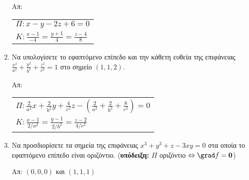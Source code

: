 \begin{enumerate}
    \hfill Απ: \begin{tabular}{l}
      $ \Pi : x-y-2z+6=0 $ \\
      $ K : \frac{x-1}{-4} = \frac{y+1}{4} = \frac{z-4}{8} $
    \end{tabular} 

  \item Να υπολογίσετε το εφαπτόμενο επίπεδο και την κάθετη ευθεία της επιφάνειας 
    $ \frac{x^{2}}{a^{2}} + \frac{y^{2}}{b^{2}} + \frac{z^{2}}{c^{2}} = 1  $ στο σημείο 
    $ (1,1,2) $.

    \hfill Απ: \begin{tabular}{l}
      $ \Pi : \frac{2}{a^{2}} x+ \frac{2}{b^{2}} y+ \frac{4}{c^{2}} z- 
      \left(\frac{2}{a^{2}}+ \frac{2}{b^{2}}+ \frac{8}{c^{2}}\right) = 0 $ \\
      $ K : \frac{x-1}{2/a^{2}} = \frac{y-1}{2/b^{2}} = \frac{z-2}{4/c^{2}} $
    \end{tabular} 

  \item Να προσδιορίσετε τα σημεία της επιφάνειας $ x^{3}+y^{3}+z-3xy=0 $ στα οποία 
    το εφαπτόμενο επίπεδο είναι οριζόντιο.
    \hfill (\textbf{υπόδειξη:} $\Pi$ οριζόντιο $ \Leftrightarrow \grad f = \mathbf{0} $)

    \hfill Απ: $ (0,0,0) $ και $ (1,1,1) $ 
\end{enumerate}


